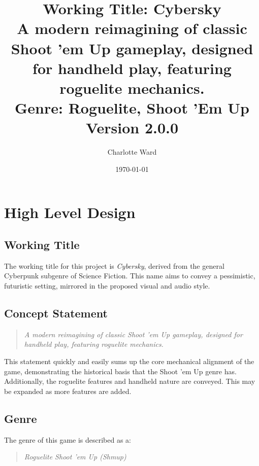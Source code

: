 \documentclass{scrartcl}
\begin{document}
\author{Charlotte Ward}
\date{\today}
\title{
{\huge Working Title: Cybersky} \\
{\small A modern reimagining of classic Shoot 'em Up gameplay, designed for handheld play, featuring roguelite mechanics.} \\
{\small Genre: Roguelite, Shoot 'Em Up} \\
{\small Version 2.0.0}
}
\maketitle

\tableofcontents

\pagebreak

\section{
  High Level Design
 }

\subsection{Working Title}

The working title for this project is \emph{Cybersky}, derived from the general Cyberpunk subgenre of Science Fiction. This name aims to convey a pessimistic, futuristic setting, mirrored in the proposed visual and audio style.

\subsection{Concept Statement}

\begin{quote}
  \emph{A modern reimagining of classic Shoot 'em Up gameplay, designed for handheld play, featuring roguelite mechanics.}
\end{quote}

This statement quickly and easily sums up the core mechanical alignment of the game, demonstrating the historical basis that the Shoot 'em Up genre has. Additionally, the roguelite features and handheld nature are conveyed. This may be expanded as more features are added.

\subsection{Genre}

The genre of this game is described as a:

\begin{quote}
  \emph{Roguelite Shoot 'em Up (Shmup)}
\end{quote}
\end{document}
